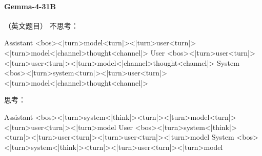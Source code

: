 \paragraph{Gemma-4-31B} （英文题目）
\noindent 不思考：
\begin{Rendering}
Assistant  <bos><|turn>model\NL{}<turn|>\NL{}<|turn>user\NL{}<turn|>\NL{}<|turn>model\NL{}<|channel>thought\NL{}<channel|>
User       <bos><|turn>user\NL{}<turn|>\NL{}<|turn>user\NL{}<turn|>\NL{}<|turn>model\NL{}<|channel>thought\NL{}<channel|>
System     <bos><|turn>system\NL{}<turn|>\NL{}<|turn>user\NL{}<turn|>\NL{}<|turn>model\NL{}<|channel>thought\NL{}<channel|>
\end{Rendering}
\noindent 思考：
\begin{Rendering}
Assistant  <bos><|turn>system\NL{}<|think|>\NL{}<turn|>\NL{}<|turn>model\NL{}<turn|>\NL{}<|turn>user\NL{}<turn|>\NL{}<|turn>model\NL{}
User       <bos><|turn>system\NL{}<|think|>\NL{}<turn|>\NL{}<|turn>user\NL{}<turn|>\NL{}<|turn>user\NL{}<turn|>\NL{}<|turn>model\NL{}
System     <bos><|turn>system\NL{}<|think|>\NL{}<turn|>\NL{}<|turn>user\NL{}<turn|>\NL{}<|turn>model\NL{}
\end{Rendering}
